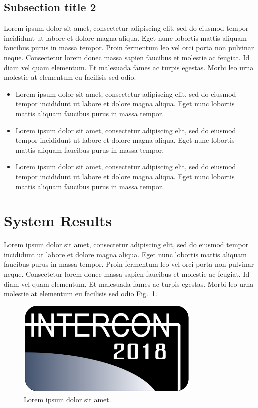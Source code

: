 \documentclass[conference]{IEEEtran}
\begin{document}
\subsection{Subsection title 2}

Lorem ipsum dolor sit amet, consectetur adipiscing elit, sed do eiusmod tempor incididunt ut labore et dolore magna aliqua. Eget nunc lobortis mattis aliquam faucibus purus in massa tempor. Proin fermentum leo vel orci porta non pulvinar neque. Consectetur lorem donec massa sapien faucibus et molestie ac feugiat. Id diam vel quam elementum. Et malesuada fames ac turpis egestas. Morbi leo urna molestie at elementum eu facilisis sed odio.

\begin{itemize}

\item Lorem ipsum dolor sit amet, consectetur adipiscing elit, sed do eiusmod tempor incididunt ut labore et dolore magna aliqua. Eget nunc lobortis mattis aliquam faucibus purus in massa tempor.

\item Lorem ipsum dolor sit amet, consectetur adipiscing elit, sed do eiusmod tempor incididunt ut labore et dolore magna aliqua. Eget nunc lobortis mattis aliquam faucibus purus in massa tempor.

\item Lorem ipsum dolor sit amet, consectetur adipiscing elit, sed do eiusmod tempor incididunt ut labore et dolore magna aliqua. Eget nunc lobortis mattis aliquam faucibus purus in massa tempor.

\end{itemize}




\section{System Results}

Lorem ipsum dolor sit amet, consectetur adipiscing elit, sed do eiusmod tempor incididunt ut labore et dolore magna aliqua. Eget nunc lobortis mattis aliquam faucibus purus in massa tempor. Proin fermentum leo vel orci porta non pulvinar neque. Consectetur lorem donec massa sapien faucibus et molestie ac feugiat. Id diam vel quam elementum. Et malesuada fames ac turpis egestas. Morbi leo urna molestie at elementum eu facilisis sed odio Fig.~\ref{figure2}.

\begin{figure}[htbp]
\centerline{\includegraphics[width=88mm]{images/image-example.png}}
\caption{Lorem ipsum dolor sit amet.}
\label{figure2}
\end{figure}
\end{document}
